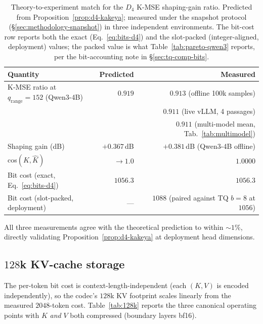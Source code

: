 \documentclass[10pt,a4paper]{article}
\theoremstyle{definition}
\theoremstyle{plain}
\begin{document}
\begin{table}[H]
\centering
\small
\caption{Theory-to-experiment match for the $D_4$ K-MSE
shaping-gain ratio. Predicted from
Proposition~\ref{prop:d4-kakeya}; measured under the snapshot
protocol (\S\ref{sec:methodology-snapshot}) in three independent
environments. The bit-cost row reports both the exact
(Eq.~\eqref{eq:bits-d4}) and the slot-packed (integer-aligned,
deployment) values; the packed value is what Table~\ref{tab:pareto-qwen3}
reports, per the bit-accounting note in \S\ref{sec:tq-comp-bits}.}
\label{tab:theory-vs-exp}
\begin{tabular}{lrr}
  \toprule
  Quantity & Predicted & Measured \\
  \midrule
  K-MSE ratio at $q_\mathrm{range}=152$ (Qwen3-4B)  & $0.919$      & $\mathbf{0.913}$ (offline 100k samples) \\
                                                 &              & $\mathbf{0.911}$ (live vLLM, 4 passages) \\
                                                 &              & $\mathbf{0.911}$ (multi-model mean, Tab.~\ref{tab:multimodel}) \\
  Shaping gain (dB)                              & $+0.367\,$dB & $+0.381\,$dB (Qwen3-4B offline) \\
  cos$(K,\hat K)$                                & $\to 1.0$    & $1.0000$ \\
  Bit cost (exact, Eq.~\eqref{eq:bits-d4})       & $1056.3$     & $1056.3$ \\
  Bit cost (slot-packed, deployment)             & ---          & $1088$ (paired against TQ $b=8$ at $1056$) \\
  \bottomrule
\end{tabular}
\end{table}

All three measurements agree with the theoretical prediction to
within $\sim\!1\%$, directly validating
Proposition~\ref{prop:d4-kakeya} at deployment head dimensions.

\subsection{$128$k KV-cache storage}
\label{sec:bench-128k}

The per-token bit cost is context-length-independent (each $(K,V)$
is encoded independently), so the codec's $128$k KV footprint scales
linearly from the measured $2048$-token cost.
Table~\ref{tab:128k} reports the three canonical operating points
with $K$ \emph{and} $V$ both compressed (boundary layers bf16).
\end{document}
